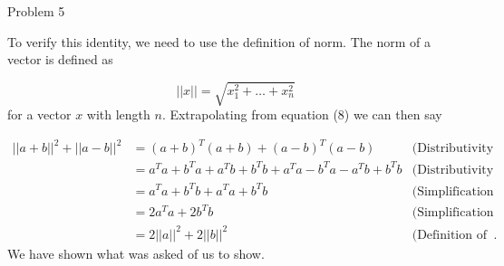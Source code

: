 \begin{problem}{Problem 5}
\begin{highlight}
        To verify this identity, we need to use the definition of norm. The norm of a vector is defined as

        \begin{equation}
            ||x|| = \sqrt{x^{2}_{1} + \dots + x^{2}_{n}}
        \end{equation}
        for a vector $x$ with length $n$. Extrapolating from equation (8) we can then say

        \begin{align}
            ||a + b||^{2} + ||a - b||^{2} & = (a + b)^{T}(a + b) + (a - b)^{T}(a - b) & \text{(Distributivity of norms)} \\
            & = a^{T}a + b^{T}a + a^{T}b + b^{T}b + a^{T}a - b^{T}a - a^{T}b + b^{T}b & \text{(Distributivity of norms)} \\
            & = a^{T}a + b^{T}b + a^{T}a + b^{T}b & \text{(Simplification by subtraction)} \\
            & = 2a^{T}a + 2b^{T}b & \text{(Simplification by addition)} \\
            & = 2||a||^{2} + 2||b||^{2} & \text{(Definition of inner products)}.
        \end{align}
        We have shown what was asked of us to show.
    \end{highlight}
\end{problem}

